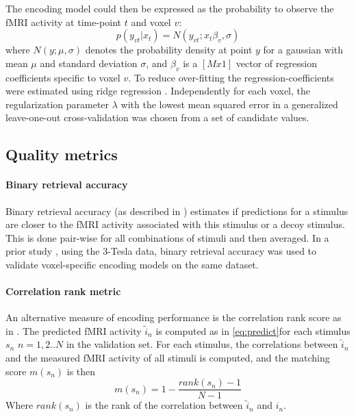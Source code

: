 The encoding model could then be expressed as the probability to observe the
f{MRI} activity at time-point $t$ and voxel $v$:
\begin{equation}\label{eq:encmo} p(y_{vt}|x_{t}) =
  N(y_{vt};x_{t}\beta_{v},\sigma) \end{equation} where $N(y;\mu,\sigma)$
denotes the probability density at point $y$ for a gaussian with mean $\mu$ and
standard deviation $\sigma$, and $\beta_{v}$ is a $[Mx1]$ vector of regression
coefficients specific to voxel $v$. To reduce over-fitting the
regression-coefficients were estimated using ridge regression \cite{HK70}.
Independently for each voxel, the regularization parameter $\lambda$ with the
lowest mean squared error in a generalized leave-one-out cross-validation
\cite{GHW79} was chosen from a set of candidate values.

\subsection*{Quality metrics} 

\paragraph{Binary retrieval accuracy}
%
Binary retrieval accuracy (as described in \cite{ML08}) estimates if
predictions for a stimulus are closer to the f{MRI} activity associated with
this stimulus or a decoy stimulus. This is done pair-wise for all combinations
of stimuli and then averaged.  In a prior study \cite{CTK+2012}, using the
3-Tesla data, binary retrieval accuracy was used to validate voxel-specific
encoding models on the same dataset.

\paragraph{Correlation rank metric}
%
%
An alternative measure of encoding performance is the correlation rank score as
in \cite{SF14}. The predicted f{MRI} activity $\widetilde{i}_{n}$ is computed
as in \ref{eq:predict}for each stimulus $s_{n}$ $n=1,2..N$  in the validation
set.  For each stimulus, the correlations between $\widetilde{i}_{n}$ and the
measured f{MRI} activity of all stimuli is computed, and the matching score
$m(s_{n})$ is then \[ m(s_{n}) = 1-\frac{rank(s_{n})-1}{N-1} \] Where
$rank(s_{n})$ is the rank of the correlation between $\widetilde{i}_{n}$ and
$i_{n}$.

